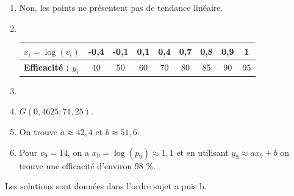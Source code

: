 {\begin{enumerate}
\item Non, les points ne présentent pas de tendance linéaire.
\item ~\\
 \begin{center}
  \begin{tabular}{|l|*8{c|}}
	 \hline
	 \textbf{$x_i = \log(v_i)$} & -0,4 & -0,1 & 0,1 & 0,4 & 0,7 & 0,8 & 0,9 & 1 \\
	 \hline
	 \textbf{Efficacité : $y_i$} & 40 & 50 & 60 & 70 & 80 & 85 & 90 & 95 \\
	 \hline
	\end{tabular}
 \end{center}
\item 

\begin{center}
\end{center}

\item $G(0,4625 ; 71,25)$.
\item On trouve $a \approx 42,4$ et $b \approx 51,6$.
\item Pour $v_9 = 14$, on a $x_9 = \log(p_9) \approx 1,1$ et en utilisant $y_9 \approx a x_9 + b$ on trouve une efficacité d'environ 
98 \%.
\end{enumerate}

}



\newpage
{}
Les solutions sont données dans l'ordre sujet a puis b. \newline
\shipoutAnswer



